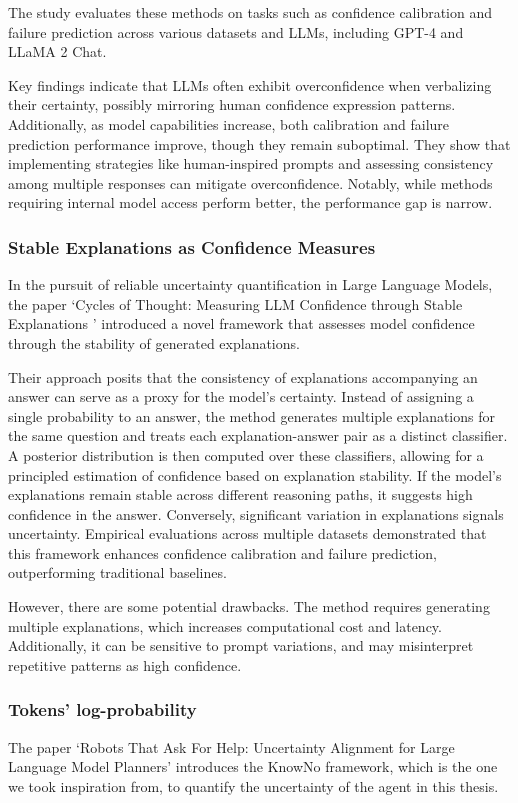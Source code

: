 The study evaluates these methods on tasks such as confidence calibration and
failure prediction across various datasets and LLMs, including GPT-4 and LLaMA 2
Chat.

Key findings indicate that LLMs often exhibit overconfidence when verbalizing their
certainty, possibly mirroring human confidence expression patterns. Additionally,
as model capabilities increase, both calibration and failure prediction performance
improve, though they remain suboptimal. They show that implementing strategies like
human-inspired prompts and assessing consistency among multiple responses can mitigate
overconfidence. Notably, while methods requiring internal model access perform better,
the performance gap is narrow.

\subsubsection{Stable Explanations as Confidence Measures}
In the pursuit of reliable uncertainty quantification in Large Language Models, the
paper `Cycles of Thought: Measuring LLM Confidence through Stable Explanations '
\cite{becker2024cyclesthoughtmeasuringllm} introduced a novel framework that assesses
model confidence through the stability of generated explanations.

Their approach posits that the consistency of explanations accompanying an answer
can serve as a proxy for the model's certainty. Instead of assigning a single
probability to an answer, the method generates multiple explanations for the same
question and treats each explanation-answer pair as a distinct classifier. A
posterior distribution is then computed over these classifiers, allowing for a principled
estimation of confidence based on explanation stability. If the model's
explanations remain stable across different reasoning paths, it suggests high confidence
in the answer. Conversely, significant variation in explanations signals uncertainty.
Empirical evaluations across multiple datasets demonstrated that this framework
enhances confidence calibration and failure prediction, outperforming traditional
baselines.

However, there are some potential drawbacks. The method requires generating multiple
explanations, which increases computational cost and latency. Additionally, it
can be sensitive to prompt variations, and may misinterpret repetitive patterns as
high confidence.

\subsubsection{Tokens' log-probability}
\label{ssub:tokens_log_probability} The paper `Robots That Ask For Help: Uncertainty
Alignment for Large Language Model Planners'
\cite{ren2023robotsaskhelpuncertainty} introduces the KnowNo framework, which is
the one we took inspiration from, to quantify the uncertainty of the agent in
this thesis.

